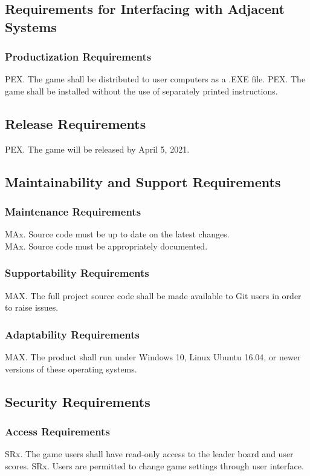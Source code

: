 \documentclass{article}
\begin{document}
\subsection{Requirements for Interfacing with Adjacent Systems}
    \subsubsection{Productization Requirements}
    PEX. The game shall be distributed to user computers as a .EXE file.
    PEX. The game shall be installed without the use of separately printed instructions.
    
 \subsection{Release Requirements}
    PEX. The game will be released by April 5, 2021.
    
 \subsection{Maintainability and Support Requirements}
    \subsubsection{Maintenance Requirements}
     MAx. Source code must be up to date on the latest changes.\\
    MAx. Source code must be appropriately documented.
    
    \subsubsection{Supportability Requirements}
    MAX. The full project source code shall be made available to Git users in order to raise issues.
    
    \subsubsection{Adaptability Requirements}
    MAX. The product shall run under Windows 10, Linux Ubuntu 16.04, or newer versions of these operating systems.
    
\subsection{Security Requirements}
    \subsubsection{Access Requirements}
    SRx. The game users shall have read-only access to the leader board and user scores.
    SRx. Users are permitted to change game settings through user interface.
    
\end{document}
